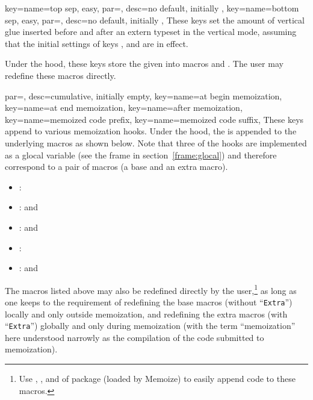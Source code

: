 \documentclass[a4paper,11pt]{article}
\begin{document}
\begin{doc}{
    key={name=top sep, easy, par={}, desc={no default, initially \code{0pt}}},
    key={name=bottom sep, easy, par={}, desc={no default, initially \code{0pt}}},
  }
  These keys set the amount of vertical glue inserted before and after an
  extern typeset in the vertical mode, assuming that the initial settings of
  keys ,  and  are in
  effect.

  Under the hood, these keys store the given  into macros
   and .  The user may
  redefine these macros directly.
\end{doc}

\begin{doc}{
    par=, desc={cumulative, initially empty},
    key={name=at begin memoization},
    key={name=at end memoization},
    key={name=after memoization},
    key={name=memoized code prefix},
    key={name=memoized code suffix},
  }
  These keys append  to various memoization hooks.  Under the hood,
  the  is appended to the underlying macros as shown below.  Note
  that three of the hooks are implemented as a glocal variable (see the frame
  in section~\ref{frame:glocal}) and therefore correspond to a pair of macros
  (a base and an extra macro).

  \begin{itemize}
    \item {}: 
    \item {}:
       and 
    \item {}:
       and 
    \item {}: 
    \item {}:
       and 
  \end{itemize}

  The macros listed above may also be redefined directly by the
  user,\footnote{Use , ,  and  of
    package  (loaded by Memoize) to easily append code to these
    macros.}  as long as one keeps to the requirement of redefining the base
  macros (without ``\texttt{Extra}'') locally and only outside memoization, and
  redefining the extra macros (with ``\texttt{Extra}'') globally and only
  during memoization (with the term ``memoization'' here understood narrowly as
  the compilation of the code submitted to memoization).


\end{doc}
\end{document}
